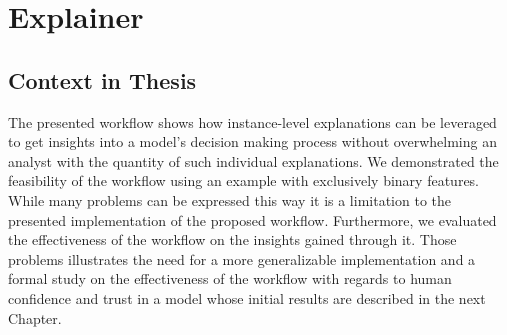 \chapter{Explainer}
\label{chap:explainer}


\section{Context in Thesis}
The presented workflow \cite{explainer} shows how instance-level explanations can be leveraged to get insights into a model's decision making process without overwhelming an analyst with the quantity of such individual explanations.
We demonstrated the feasibility of the workflow using an example with exclusively binary features.
While many problems can be expressed this way it is a limitation to the presented implementation of the proposed workflow.
Furthermore, we evaluated the effectiveness of the workflow on the insights gained through it.
Those problems illustrates the need for a more generalizable implementation and a formal study on the effectiveness of the workflow with regards to human confidence and trust in a model whose initial results are described in the next Chapter.


